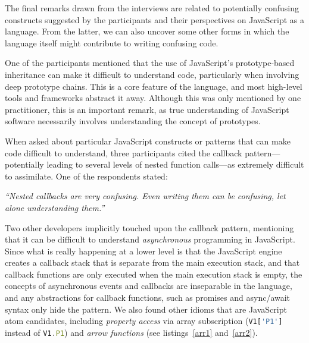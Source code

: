 The final remarks drawn from the interviews are related to potentially confusing constructs suggested by the participants and their perspectives on JavaScript as a language.
From the latter, we can also uncover some other forms in which the language itself might contribute to writing confusing code.

One of the participants mentioned that the use of JavaScript's prototype-based inheritance can make it difficult to understand code, particularly when involving  deep prototype chains. This is a core feature of the language, and most high-level tools and frameworks abstract it away. Although this was only mentioned by one practitioner, this is an important remark, as true understanding of JavaScript software necessarily involves understanding the concept of prototypes.

When asked about particular JavaScript constructs or patterns that can make code difficult to understand, three participants cited the callback pattern---potentially leading to several levels of nested function calls---as extremely difficult to assimilate. 
One of the respondents stated:

\begin{mq}
\emph{``Nested callbacks are very confusing. Even writing them can be confusing, let alone understanding them.''}
\end{mq}

Two other developers implicitly touched upon the callback pattern, mentioning that it can be difficult to understand \emph{asynchronous} programming in JavaScript. Since what is really happening at a lower level is that the JavaScript engine creates a callback stack that is separate from the main execution stack, and that callback functions are only executed when the main execution stack is empty, the concepts of asynchronous events and callbacks are inseparable in the language, and any abstractions for callback functions, such as promises and async/await syntax only hide the pattern. We also found other idioms that are JavaScript atom candidates, including
\emph{property access} via array subscription (\lstinline[language=javascript]{V1['P1']} instead of \lstinline[language=javascript]{V1.P1}) and \emph{arrow functions} (see listings~\ref{arr1} and~\ref{arr2}). 

